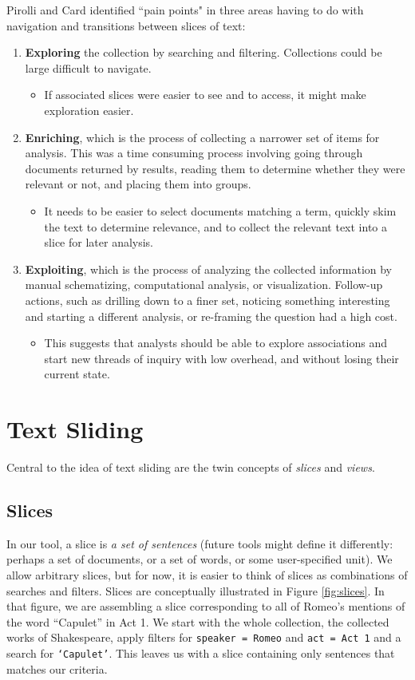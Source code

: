 \documentclass{sig-alternate}
\newcommand{\strong}[1] {\textbf{#1}}
\newcommand{\code}[1] {\texttt{#1}}
\begin{document}
Pirolli and Card \cite{pirolli_sensemaking_2005} identified ``pain points" in three areas having to do with navigation and transitions between slices of text:
\begin{enumerate}
\item \strong{Exploring} the collection by searching and filtering. Collections could be large difficult to navigate. 
	\begin{itemize}
		\item If  associated slices were easier to see and to access, it might make exploration easier. 
	\end{itemize}
\item \strong{Enriching}, which is the process of collecting a narrower set of items for analysis. This was a time consuming process involving going through documents returned by results, reading them to determine whether they were relevant or not, and placing them into groups.
	\begin{itemize}
		\item It needs to be easier to select documents matching a term, quickly skim the text to determine relevance, and to collect the relevant text into a slice for later analysis.
	\end{itemize}
\item \strong{Exploiting}, which is the process of analyzing the collected information by manual schematizing, computational analysis, or visualization. Follow-up actions, such as drilling down to a finer set, noticing something interesting and starting a different analysis, or re-framing the question had a high cost.
	\begin{itemize}
		\item This suggests that analysts should be able to explore associations and start new threads of inquiry with low overhead, and without losing their current state.
	\end{itemize}
\end{enumerate}

\section{Text Sliding}

Central to the idea of text sliding are the twin concepts of \emph{slices} and \emph{views}.  

\subsection{Slices}
In our tool, a slice is \emph{a set of sentences} (future tools might define it differently: perhaps a set of documents, or a set of words, or some user-specified unit). We allow arbitrary slices, but for now, it is easier to think of slices as combinations of searches and filters. Slices are conceptually illustrated in Figure \ref{fig:slices}. In that figure, we are assembling a slice corresponding to all of Romeo's mentions of the word ``Capulet'' in Act 1. We start with the whole collection, the collected works of Shakespeare, apply filters for \code{speaker = Romeo} and \code{act = Act 1}  and a search for \code{`Capulet'}. This leaves us with a slice containing only sentences that matches our criteria.
\end{document}
